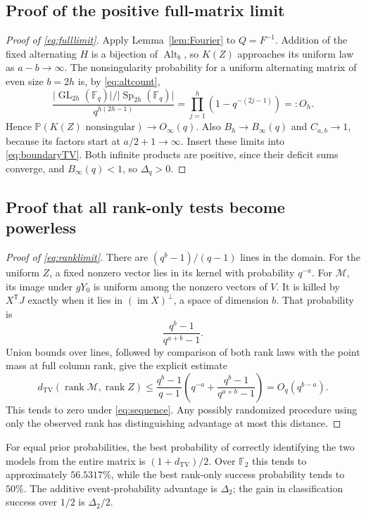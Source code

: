 \documentclass[11pt]{article}
\numberwithin{equation}{section}
\theoremstyle{definition}
\theoremstyle{remark}
\newcommand{\F}{\mathbb F}
\newcommand{\Prob}{\mathbb P}
\newcommand{\TV}{d_{\mathrm{TV}}}
\newcommand{\Alt}{\operatorname{Alt}}
\newcommand{\Sp}{\operatorname{Sp}}
\newcommand{\GL}{\operatorname{GL}}
\newcommand{\rank}{\operatorname{rank}}
\newcommand{\im}{\operatorname{im}}
\newcommand{\tr}{\mathsf T}
\newcommand{\abs}[1]{\lvert#1\rvert}
\newcommand{\Binf}{B_\infty(q)}
\newcommand{\Oinf}{O_\infty(q)}
\begin{document}
\subsection{Proof of the positive full-matrix limit}
\begin{proof}[Proof of \eqref{eq:fulllimit}]
Apply Lemma~\ref{lem:Fourier} to $Q=F^{-1}$. Addition of the fixed alternating $H$ is a bijection of $\Alt_b$, so $K(Z)$ approaches its uniform law as $a-b\to\infty$. The nonsingularity probability for a uniform alternating matrix of even size $b=2h$ is, by \eqref{eq:altcount},
\begin{equation}\label{eq:oddprob}
 \frac{\abs{\GL_{2h}(\F_q)} /\abs{\Sp_{2h}(\F_q)}}
 {q^{h(2h-1)}}
 =\prod_{j=1}^h(1-q^{-(2j-1)})=:O_h.
\end{equation}
Hence $\Prob(K(Z)\text{ nonsingular})\to\Oinf$. Also $B_h\to\Binf$ and $C_{a,b}\to1$, because its factors start at $a/2+1\to\infty$. Insert these limits into \eqref{eq:boundaryTV}. Both infinite products are positive, since their deficit sums converge, and $\Binf<1$, so $\Delta_q>0$.
\end{proof}

\subsection{Proof that all rank-only tests become powerless}
\begin{proof}[Proof of \eqref{eq:ranklimit}]
There are $(q^b-1)/(q-1)$ lines in the domain. For the uniform $Z$, a fixed nonzero vector lies in its kernel with probability $q^{-a}$. For $\mathcal M$, its image under $gY_0$ is uniform among the nonzero vectors of $V$. It is killed by $X^\tr J$ exactly when it lies in $(\im X)^\perp$, a space of dimension $b$. That probability is
\[
 \frac{q^b-1}{q^{a+b}-1}.
\]
Union bounds over lines, followed by comparison of both rank laws with the point mass at full column rank, give the explicit estimate
\begin{equation}\label{eq:rankbound}
 \TV(\rank\mathcal M,\rank Z)
 \le\frac{q^b-1}{q-1}
 \left(q^{-a}+\frac{q^b-1}{q^{a+b}-1}\right)
 =O_q(q^{b-a}).
\end{equation}
This tends to zero under \eqref{eq:sequence}. Any possibly randomized procedure using only the observed rank has distinguishing advantage at most this distance.
\end{proof}

For equal prior probabilities, the best probability of correctly identifying the two models from the entire matrix is $(1+\TV)/2$. Over $\F_2$ this tends to approximately $56.5317\%$, while the best rank-only success probability tends to $50\%$. The additive event-probability advantage is $\Delta_2$; the gain in classification success over $1/2$ is $\Delta_2/2$.
\end{document}

